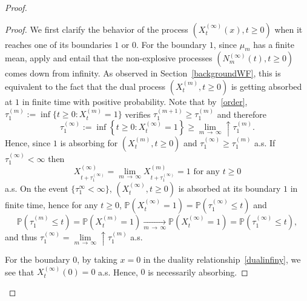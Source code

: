 \documentclass[10pt]{amsart}
\theoremstyle{definition}\newtheorem{defi}[theo]{Definition}\newtheorem{rema}[theo]{Remark}\newtheorem{exam}[theo]{Example}\newtheorem{exem}[theo]{Example}\newtheorem{nota}[theo]{Notation}
\newcommand{\bbP}{\mathbb{P}}
\begin{document}
\begin{proof}
\begin{proof}
We first clarify the behavior of the process $(X^{(\infty)}_t(x),t\geq 0)$ when it reaches one of its boundaries $1$ or $0$. For the boundary $1$, since $\mu_m$ has a finite mean, \cite[Corollary~1.4 and Remark~1.5]{cdiEFC} apply and entail that the non-explosive processes $(N^{(\infty)}_m(t),t\geq 0)$ comes down from infinity. As observed in Section~\ref{backgroundWF}, this is equivalent to the fact that the dual process $(X_t^{(m)},t\geq 0)$ is getting absorbed at $1$ in finite time with positive probability. Note that by~\eqref{order}, $\tau_1^{(m)}:=\inf\{t\geq 0: X_t^{(m)}=1\}$ verifies $\tau_1^{(m+1)}\geq \tau_1^{(m)}$ and therefore
\[
\tau_1^{(\infty)}:=\inf\left\{t\geq 0: X^{(\infty)}_t=1\right\}\geq \underset{m\,\rightarrow\,\infty}{\lim}\uparrow \tau_1^{(m)}.
\]
Hence, since $1$ is absorbing for $(X_t^{(m)},t\geq 0)$ and $\tau_1^{(\infty)}\geq \tau_1^{(m)}$ a.s. If $\tau_1^{(\infty)}<\infty$ then 
\[
X^{(\infty)}_{t+\tau_1^{(\infty)}}=\underset{m\,\rightarrow\,\infty}{\lim} X^{(m)}_{t+\tau_1^{(\infty)}}=1 \text{ for any } t\geq 0
\]
a.s. On the event $\{\tau_1^{\infty}<\infty\}$, $(X^{(\infty)}_t,t\geq 0)$ is absorbed at its boundary $1$ in finite time, hence for any $t\geq 0$, $\bbP(X^{(\infty)}_t=1)=\bbP(\tau_1^{(\infty)}\leq t)$ and
\[
\bbP\left(\tau_1^{(m)}\leq t\right)=\bbP\left(X^{(m)}_t=1\right)\underset{m\,\rightarrow\,\infty}{\longrightarrow} \bbP(X^{(\infty)}_t=1)=\bbP(\tau_1^{(\infty)}\leq t),
\]
and thus $\tau_1^{(\infty)}=\underset{m\,\rightarrow\,\infty}{\lim}\uparrow \tau_1^{(m)}$ a.s.

For the boundary $0$, by taking $x=0$ in the duality relationship~\eqref{dualinfiny}, we see that $X_t^{(\infty)}(0)=0$ a.s. Hence, $0$ is necessarily absorbing.


\end{proof}
\end{proof}
\end{document}
